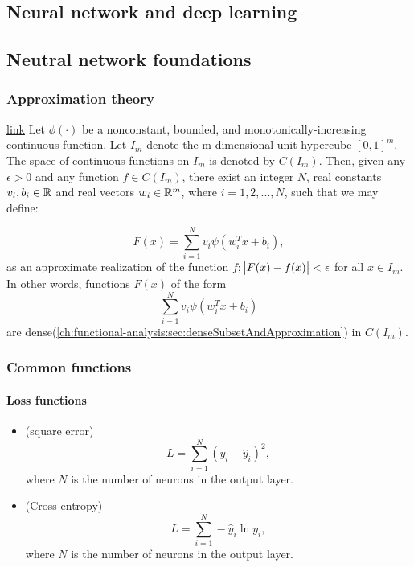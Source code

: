 
\begin{refsection}
\chapter{Neural network and deep learning}
\minitoc

\section{Neutral network foundations}

\subsection{Approximation theory}

\begin{theorem}\href{https://en.wikipedia.org/wiki/Universal_approximation_theorem}{link}
Let $\phi(\cdot)$ be a nonconstant, bounded, and monotonically-increasing continuous function. Let $I_m$ denote the m-dimensional unit hypercube $[0,1]^m$. The space of continuous functions on $I_m$ is denoted by $C(I_m)$. Then, given any $\epsilon>0$ and any function $f\in C(I_m)$, there exist an integer $N$, real constants $v_i,b_i\in \mathbb{R}$ and real vectors $w_i\in \mathbb{R}^m$, where $i=1,2,...,N$, such that we may define:

$$F(x) = \sum_{i=1}^{N} v_i \psi(w_i^Tx+b_i),$$
as an approximate realization of the function $f$;
$\abs{F(x) - f(x)} < \epsilon$ for all $x\in I_m$. In other words, functions $F(x)$ of the form $$\sum_{i=1}^{N} v_i \psi(w_i^Tx+b_i)$$ are dense(\autoref{ch:functional-analysis:sec:denseSubsetAndApproximation}) in $C(I_{m})$.
\end{theorem}


\begin{remark}[interpretation]
	
\end{remark}

\subsection{Common functions}
\subsubsection{Loss functions}

\begin{definition}\hfill
\begin{itemize}
	\item (square error)
	$$L = \sum_{i=1}^{N} (y_i - \hat{y}_i)^2,$$
	where $N$ is the number of neurons in the output layer.
	\item (Cross entropy)
	$$L = \sum_{i=1}^{N} -\hat{y}_i\ln y_i,$$
where $N$ is the number of neurons in the output layer.
	

\end{itemize}
\end{definition}
\end{refsection}
